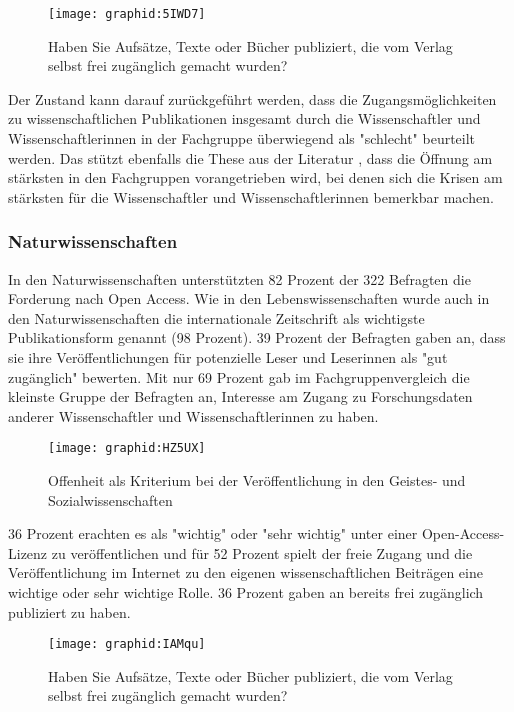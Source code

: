 \begin{figure}[h!]
\texttt{[image: graphid:5IWD7]}
\caption{Haben Sie Aufsätze, Texte oder Bücher publiziert, die vom Verlag selbst frei zugänglich gemacht wurden?}
\end{figure}

Der Zustand kann darauf zurückgeführt werden, dass die Zugangsmöglichkeiten zu wissenschaftlichen Publikationen insgesamt durch die Wissenschaftler und Wissenschaftlerinnen in der Fachgruppe überwiegend als "schlecht" beurteilt werden. Das stützt ebenfalls die These aus der Literatur \cite[:6]{Naeder_2010}, dass die Öffnung am stärksten in den Fachgruppen vorangetrieben wird, bei denen sich die Krisen am stärksten für die Wissenschaftler und Wissenschaftlerinnen bemerkbar machen.

\subsubsection{Naturwissenschaften}

In den Naturwissenschaften unterstützten 82 Prozent der 322 Befragten die Forderung nach Open Access. Wie in den Lebenswissenschaften wurde auch in den Naturwissenschaften die internationale Zeitschrift als wichtigste Publikationsform genannt (98 Prozent). 39 Prozent der Befragten gaben an, dass sie ihre Veröffentlichungen für potenzielle Leser und Leserinnen als "gut zugänglich" bewerten. Mit nur 69 Prozent gab im Fachgruppenvergleich die kleinste Gruppe der Befragten an, Interesse am Zugang zu Forschungsdaten anderer Wissenschaftler und Wissenschaftlerinnen zu haben.

\begin{figure}[h!]
\texttt{[image: graphid:HZ5UX]}
\caption{Offenheit als Kriterium bei der Veröffentlichung in den Geistes- und Sozialwissenschaften}
\end{figure}

36 Prozent erachten es als "wichtig" oder "sehr wichtig" unter einer Open-Access-Lizenz zu veröffentlichen und für 52 Prozent spielt der freie Zugang und die Veröffentlichung im Internet zu den eigenen wissenschaftlichen Beiträgen eine wichtige oder sehr wichtige Rolle. 36 Prozent gaben an bereits frei zugänglich publiziert zu haben.

\begin{figure}[h!]
\texttt{[image: graphid:IAMqu]}
\caption{Haben Sie Aufsätze, Texte oder Bücher publiziert, die vom Verlag selbst frei zugänglich gemacht wurden?}
\end{figure}

